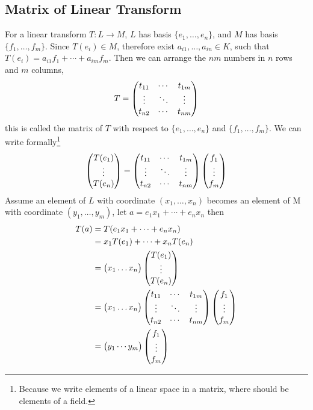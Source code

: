 \subsection{Matrix of Linear Transform}
For a linear transform $T : L \to M$, $L$ has basis $\{e_1, \dots, e_n\}$,
and $M$ has basis $\{f_1, \dots, f_m\}$.
Since $T(e_i) \in M$, therefore exist $a_{i1}, \dots, a_{in} \in K$,
such that $T(e_i) = a_{i1} f_1 + \cdots + a_{im}f_m$.
Then we can arrange the $nm$ numbers in $n$ rows and $m$ columns,
$$
T = \left(\begin{matrix}
t_{11} & \cdots & t_{1m}	\cr
\vdots & \ddots & \vdots \cr
t_{n2} & \cdots & t_{nm}
\end{matrix}\right)
$$
this is called the matrix of $T$ with respect to $\{e_1, \dots, e_n\}$ and $\{f_1, \dots, f_m\}$.
We can write formally\footnote{Because we write elements of a linear space in a matrix,
where should be elements of a field.}
$$
\left(\begin{matrix}
T(e_1) \cr \vdots \cr T(e_n)
\end{matrix}\right)
=
\left(\begin{matrix}
t_{11} & \cdots & t_{1m}	\cr
\vdots & \ddots & \vdots \cr
t_{n2} & \cdots & t_{nm}
\end{matrix}\right)
\left(\begin{matrix}
f_1 \cr \vdots \cr f_m
\end{matrix}\right)
$$
Assume an element of $L$ with coordinate $(x_1, \dots, x_n)$ becomes an element of M
with coordinate $(y_1, \dots, y_m)$, let $a = e_1x_1 + \cdots + e_nx_n$ then
\begin{align*}
T(a)
&= T(e_1x_1 + \cdots + e_nx_n) \\
&= x_1T(e_1) + \cdots + x_nT(e_n) \\
&=
\left(\begin{matrix}
x_1 \dots x_n
\end{matrix}\right)
\left(\begin{matrix}
T(e_1) \cr \vdots \cr T(e_n)
\end{matrix}\right) \\
&=
\left(\begin{matrix}
x_1 \dots x_n
\end{matrix}\right)
\left(\begin{matrix}
t_{11} & \cdots & t_{1m}	\cr
\vdots & \ddots & \vdots \cr
t_{n2} & \cdots & t_{nm}
\end{matrix}\right)
\left(\begin{matrix}
f_1 \cr \vdots \cr f_m
\end{matrix}\right) \\
&=
\left(\begin{matrix}
y_1 \cdots y_m
\end{matrix}\right)
\left(\begin{matrix}
f_1 \cr \vdots \cr f_m
\end{matrix}\right)
\end{align*}
